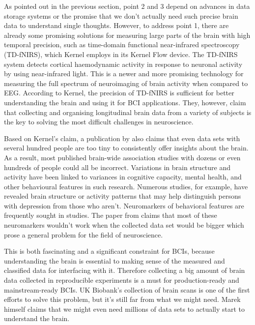 As pointed out in the previous section, point 2 and 3 depend on advances in data storage systems or the promise that we don't actually need such precise brain data to understand single thoughts. However, to address point 1, there are already some promising solutions for measuring large parts of the brain with high temporal precision, such as time-domain functional near-infrared spectroscopy (TD-fNIRS), which Kernel employs in its Kernel Flow device. The TD-fNIRS system detects cortical haemodynamic activity in response to neuronal activity by using near-infrared light. This is a newer and more promising technology for measuring the full spectrum of neuroimaging of brain activity when compared to EEG. According to Kernel, the precision of TD-fNIRS is sufficient for better understanding the brain and using it for BCI applications. They, however, claim that collecting and organising longitudinal brain data from a variety of subjects is the key to solving the most difficult challenges in neuroscience.

Based on Kernel's claim, a publication by \citeauthor{marek_reproducible_2022} also claims that even data sets with several hundred people are too tiny to consistently offer insights about the brain. As a result, most published brain-wide association studies with dozens or even hundreds of people could all be incorrect. Variations in brain structure and activity have been linked to variances in cognitive capacity, mental health, and other behavioural features in such research. Numerous studies, for example, have revealed brain structure or activity patterns that may help distinguish persons with depression from those who aren't. Neuromarkers of behavioral features are frequently sought in studies. The paper from \citeauthor{marek_reproducible_2022} claims that most of these neuromarkers wouldn't work when the collected data set would be bigger which prose a general problem for the field of neuroscience.

This is both fascinating and a significant constraint for BCIs, because understanding the brain is essential to making sense of the measured and classified data for interfacing with it. Therefore collecting a big amount of brain data collected in reproducible experiments is a must for production-ready and mainstream-ready BCIs. UK Biobank's collection of brain scans is one of the first efforts to solve this problem, but it's still far from what we might need. Marek himself claims that we might even need millions of data sets to actually start to understand the brain.


